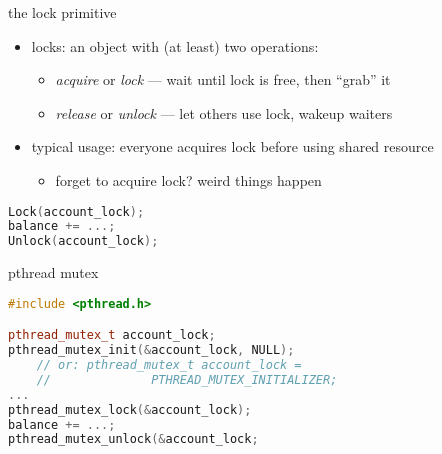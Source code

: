 \begin{frame}[fragile,label=lockDefn]{the lock primitive}
    \begin{itemize}
    \item locks: an object with (at least) two operations:
        \begin{itemize}
        \item \textit{acquire} or \textit{lock} --- wait until lock is free, then ``grab'' it
        \item \textit{release} or \textit{unlock} --- let others use lock, wakeup waiters
        \end{itemize}
    \item typical usage: everyone acquires lock before using shared resource
        \begin{itemize}
        \item forget to acquire lock? weird things happen
        \end{itemize}
    \end{itemize}
\begin{lstlisting}[language=C++,style=small]
Lock(account_lock);
balance += ...;
Unlock(account_lock);
\end{lstlisting}
\end{frame}


\begin{frame}[fragile,label=pthreadMutex]{pthread mutex}
\begin{lstlisting}[language=C++,style=small]
#include <pthread.h>

pthread_mutex_t account_lock;
pthread_mutex_init(&account_lock, NULL);
    // or: pthread_mutex_t account_lock =
    //              PTHREAD_MUTEX_INITIALIZER;
...
pthread_mutex_lock(&account_lock);
balance += ...;
pthread_mutex_unlock(&account_lock;
\end{lstlisting}
\end{frame}

